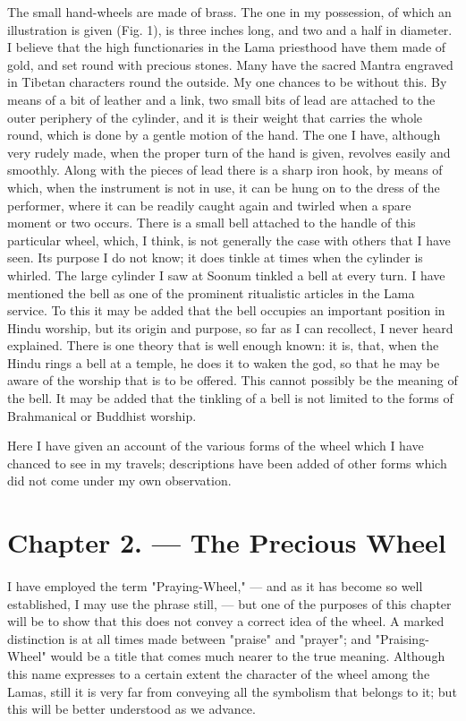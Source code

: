 \documentclass[a4paper, 11pt, oneside, polutonikogreek, english]{article}
\begin{document}
The small hand-wheels are made of brass. The one in my possession, of which an illustration is given (Fig. 1), is three inches long, and two and a half in diameter. I believe that the high functionaries in the Lama priesthood have them made of gold, and set round with precious stones. Many have the sacred Mantra engraved in Tibetan characters round the outside. My one chances to be without this. By means of a bit of leather and a link, two small bits of lead are attached to the outer periphery of the cylinder, and it is their weight that carries the whole round, which is done by a gentle motion of the hand. The one I have, although very rudely made, when the proper turn of the hand is given, revolves easily and smoothly. Along with the pieces of lead there is a sharp iron hook, by means of which, when the instrument is not in use, it can be hung on to the dress of the performer, where it can be readily caught again and twirled when a spare moment or two occurs. There is a small bell attached to the handle of this particular wheel, which, I think, is not generally the case with others that I have seen. Its purpose I do not know; it does tinkle at times when the cylinder is whirled. The large cylinder I saw at Soonum tinkled a bell at every turn. I have mentioned the bell as one of the prominent ritualistic articles in the Lama service. To this it may be added that the bell occupies an important position in Hindu worship, but its origin and purpose, so far as I can recollect, I never heard explained. There is one theory that is well enough known: it is, that, when the Hindu rings a bell at a temple, he does it to waken the god, so that he may be aware of the worship that is to be offered. This cannot possibly be the meaning of the bell. It may be added that the tinkling of a bell is not limited to the forms of Brahmanical or Buddhist worship.

Here I have given an account of the various forms of the wheel which I have chanced to see in my travels; descriptions have been added of other forms which did not come under my own observation.
\clearpage
\section{Chapter 2. --- The Precious Wheel}
\paragraph{}
I have employed the term "Praying-Wheel," --- and as it has become so well established, I may use the phrase still, --- but one of the purposes of this chapter will be to show that this does not convey a correct idea of the wheel. A marked distinction is at all times made between "praise" and "prayer"; and "Praising-Wheel" would be a title that comes much nearer to the true meaning. Although this name expresses to a certain extent the character of the wheel among the Lamas, still it is very far from conveying all the symbolism that belongs to it; but this will be better understood as we advance.
\end{document}
